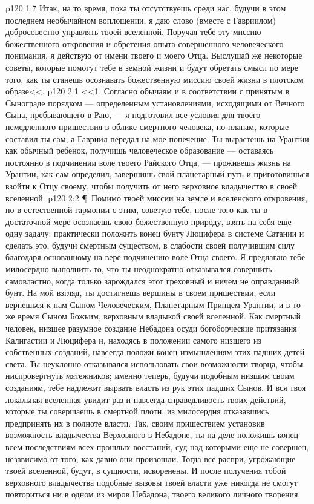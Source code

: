 \vs p120 1:7 Итак, на то время, пока ты отсутствуешь среди нас, будучи в этом последнем необычайном воплощении, я даю слово (вместе с Гавриилом) добросовестно управлять твоей вселенной. Поручая тебе эту миссию божественного откровения и обретения опыта совершенного человеческого понимания, я действую от имени твоего и моего Отца. Выслушай же некоторые советы, которые помогут тебе в земной жизни и будут обретать смысл по мере того, как ты станешь осознавать божественную миссию своей жизни в плотском образе<<.
\vs p120 2:1 <<1. Согласно обычаям и в соответствии с принятым в Сынограде порядком --- определенным установлениями, исходящими от Вечного Сына, пребывающего в Раю, --- я подготовил все условия для твоего немедленного пришествия в облике смертного человека, по планам, которые составил ты сам, а Гавриил передал на мое попечение. Ты вырастешь на Урантии как обычный ребенок, получишь человеческое образование --- оставаясь постоянно в подчинении воле твоего Райского Отца, --- проживешь жизнь на Урантии, как сам определил, завершишь свой планетарный путь и приготовишься взойти к Отцу своему, чтобы получить от него верховное владычество в своей вселенной.
\vs p120 2:2 \P\ \bibnobreakspace Помимо твоей миссии на земле и вселенского откровения, но в естественной гармонии с этим, советую тебе, после того как ты в достаточной мере осознаешь свою божественную природу, взять на себя еще одну задачу: практически положить конец бунту Люцифера в системе Сатании и сделать это, будучи  смертным существом, в слабости своей получившим силу благодаря основанному на вере подчинению воле Отца своего. Я предлагаю тебе милосердно выполнить то, что ты неоднократно отказывался совершить самовластно, когда только зарождался этот греховный и ничем не оправданный бунт. На мой взгляд, ты достигнешь вершины в своем пришествии, если вернешься к нам Сыном Человеческим, Планетарным Принцем Урантии, и в то же время Сыном Божьим, верховным владыкой своей вселенной. Как смертный человек, низшее разумное создание Небадона осуди богоборческие притязания Калигастии и Люцифера и, находясь в положении самого низшего из собственных созданий, навсегда положи конец измышлениям этих падших детей света. Ты неуклонно отказывался использовать свои возможности творца, чтобы ниспровергнуть мятежников; именно теперь, будучи подобным низшим своим созданиям, тебе надлежит вырвать власть из рук этих падших Сынов. И вся твоя локальная вселенная увидит раз и навсегда справедливость твоих действий, которые ты совершаешь в смертной плоти, из милосердия отказавшись предпринять их в полноте власти. Так, своим пришествием установив возможность владычества Верховного в Небадоне, ты на деле положишь конец всем последствиям всех прошлых восстаний, суд над которыми еще не совершен, независимо от того, как давно они произошли. Тогда все распри, угрожающие твоей вселенной, будут, в сущности, искоренены. И после получения тобой верховного владычества подобные вызовы твоей власти уже никогда не смогут повториться ни в одном из миров Небадона, твоего великого личного творения.
